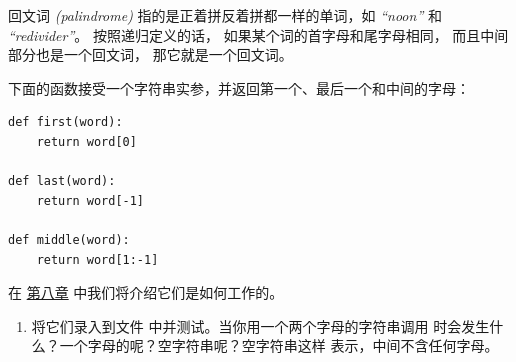 \begin{exercise}
\label{palindrome}


回文词 {\em (palindrome)} 指的是正着拼反着拼都一样的单词，如 {\em ``noon''} 和 {\em ``redivider''}。
按照递归定义的话， 如果某个词的首字母和尾字母相同， 而且中间部分也是一个回文词， 那它就是一个回文词。


下面的函数接受一个字符串实参，并返回第一个、最后一个和中间的字母：

\begin{em}
\begin{lstlisting}
def first(word):
    return word[0]

def last(word):
    return word[-1]

def middle(word):
    return word[1:-1]
\end{lstlisting}
\end{em}

%

在 \hyperref[strings]{第八章} 中我们将介绍它们是如何工作的。


\begin{enumerate}

\item 将它们录入到文件 {\em {}} 中并测试。当你用一个两个字母的字符串调用 {\em {}} 时会发生什么？一个字母的呢？空字符串呢？空字符串这样 {\em {}} 表示，中间不含任何字母。


\end{enumerate}
\end{exercise}
